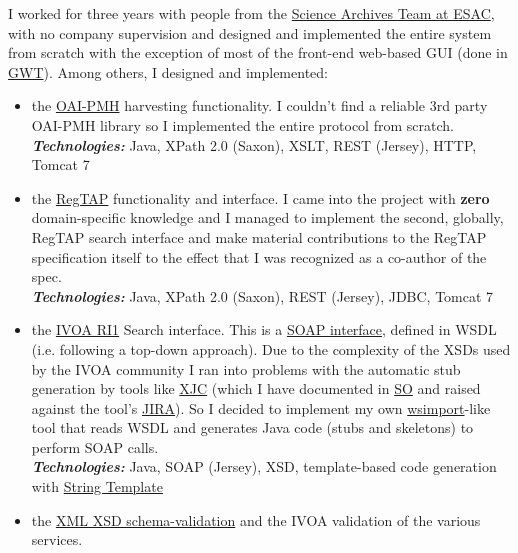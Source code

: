 \documentclass[10pt,a4paper]{article} %
\newcommand{\technologies}[0]{\textbf{\textit{Technologies:}}}
\begin{document}
{{{  I worked for three years with people from the \href{http://www.sciops.esa.int/index.php?project=SAT}{Science
    Archives Team at ESAC}, with no company supervision
  and designed and implemented the entire system from scratch with the exception of most
  of the front-end web-based GUI (done in \href{http://www.gwtproject.org/}{GWT}).
  Among others, I designed and implemented:
  \begin{itemize}
  \item the \href{http://www.openarchives.org/pmh/}{OAI-PMH} harvesting functionality. I couldn't find a reliable 3rd party OAI-PMH library
    so I implemented the entire protocol from scratch.\\
    \technologies{} Java, XPath 2.0 (Saxon), XSLT, REST (Jersey), HTTP, Tomcat 7
  \item the \href{http://www.ivoa.net/documents/RegTAP/}{RegTAP} functionality and interface. I came into the project with \textbf{zero} domain-specific
    knowledge and I managed to implement the second, globally, RegTAP search interface and make material
    contributions to the RegTAP specification itself to the effect that I was recognized as a co-author of the spec.\\
    \technologies{} Java, XPath 2.0 (Saxon), REST (Jersey), JDBC, Tomcat 7
  \item the \href{http://www.ivoa.net/documents/RegistryInterface/20091104/REC-RegistryInterface-1.0.pdf}{IVOA RI1} Search interface. This is a \href{https://en.wikipedia.org/wiki/SOAP}{SOAP interface}, defined in WSDL (i.e. following a top-down approach). 
    Due to the complexity of the XSDs used by the IVOA community I ran into problems with the automatic stub
    generation by tools like \href{https://docs.oracle.com/javase/6/docs/technotes/tools/share/xjc.html}{XJC} (which I have documented in \href{http://stackoverflow.com/q/17265960/274677}{SO} and raised
    against the tool's \href{https://java.net/jira/browse/JAXB-965}{JIRA}). So I decided to implement
    my own \href{https://docs.oracle.com/javase/6/docs/technotes/tools/share/wsimport.html}{wsimport}-like tool that reads WSDL and generates Java code (stubs and skeletons) to perform SOAP calls.\\
    \technologies{} Java, SOAP (Jersey), XSD, template-based code generation with \href{http://www.stringtemplate.org/.}{String Template}
  \item the \href{https://en.wikipedia.org/wiki/XML_Schema_(W3C)}{XML XSD schema-validation}
    and the IVOA validation of the various services.

\end{itemize}}}}
\end{document}
